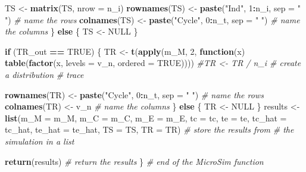 \documentclass[
]{article}
\newenvironment{Shaded}{\begin{snugshade}}{\end{snugshade}}
\newcommand{\AttributeTok}[1]{\textcolor[rgb]{0.13,0.29,0.53}{#1}}
\newcommand{\CommentTok}[1]{\textcolor[rgb]{0.56,0.35,0.01}{\textit{#1}}}
\newcommand{\ConstantTok}[1]{\textcolor[rgb]{0.56,0.35,0.01}{#1}}
\newcommand{\ControlFlowTok}[1]{\textcolor[rgb]{0.13,0.29,0.53}{\textbf{#1}}}
\newcommand{\DecValTok}[1]{\textcolor[rgb]{0.00,0.00,0.81}{#1}}
\newcommand{\FunctionTok}[1]{\textcolor[rgb]{0.13,0.29,0.53}{\textbf{#1}}}
\newcommand{\NormalTok}[1]{#1}
\newcommand{\OtherTok}[1]{\textcolor[rgb]{0.56,0.35,0.01}{#1}}
\newcommand{\SpecialCharTok}[1]{\textcolor[rgb]{0.81,0.36,0.00}{\textbf{#1}}}
\newcommand{\StringTok}[1]{\textcolor[rgb]{0.31,0.60,0.02}{#1}}
\begin{document}
\begin{Shaded}
\begin{Highlighting}[]
\NormalTok{    TS }\OtherTok{\textless{}{-}} \FunctionTok{matrix}\NormalTok{(TS, }\AttributeTok{nrow =}\NormalTok{ n\_i)}
    \FunctionTok{rownames}\NormalTok{(TS) }\OtherTok{\textless{}{-}} \FunctionTok{paste}\NormalTok{(}\StringTok{"Ind"}\NormalTok{,   }\DecValTok{1}\SpecialCharTok{:}\NormalTok{n\_i, }\AttributeTok{sep =} \StringTok{" "}\NormalTok{)   }\CommentTok{\# name the rows }
    \FunctionTok{colnames}\NormalTok{(TS) }\OtherTok{\textless{}{-}} \FunctionTok{paste}\NormalTok{(}\StringTok{"Cycle"}\NormalTok{, }\DecValTok{0}\SpecialCharTok{:}\NormalTok{n\_t, }\AttributeTok{sep =} \StringTok{" "}\NormalTok{)   }\CommentTok{\# name the columns }
\NormalTok{  \} }\ControlFlowTok{else}\NormalTok{ \{}
\NormalTok{    TS }\OtherTok{\textless{}{-}} \ConstantTok{NULL}
\NormalTok{  \}}
  
  \ControlFlowTok{if}\NormalTok{ (TR\_out }\SpecialCharTok{==} \ConstantTok{TRUE}\NormalTok{) \{}
\NormalTok{    TR }\OtherTok{\textless{}{-}} \FunctionTok{t}\NormalTok{(}\FunctionTok{apply}\NormalTok{(m\_M, }\DecValTok{2}\NormalTok{, }
                  \ControlFlowTok{function}\NormalTok{(x) }\FunctionTok{table}\NormalTok{(}\FunctionTok{factor}\NormalTok{(x, }\AttributeTok{levels =}\NormalTok{ v\_n, }\AttributeTok{ordered =} \ConstantTok{TRUE}\NormalTok{))))}
    \CommentTok{\#TR \textless{}{-} TR / n\_i                                   \# create a distribution }
    \CommentTok{\# trace}
    
    \FunctionTok{rownames}\NormalTok{(TR) }\OtherTok{\textless{}{-}} \FunctionTok{paste}\NormalTok{(}\StringTok{"Cycle"}\NormalTok{, }\DecValTok{0}\SpecialCharTok{:}\NormalTok{n\_t, }\AttributeTok{sep =} \StringTok{" "}\NormalTok{) }\CommentTok{\# name the rows }
    \FunctionTok{colnames}\NormalTok{(TR) }\OtherTok{\textless{}{-}}\NormalTok{ v\_n                              }\CommentTok{\# name the columns }
\NormalTok{  \} }\ControlFlowTok{else}\NormalTok{ \{}
\NormalTok{    TR }\OtherTok{\textless{}{-}} \ConstantTok{NULL}
\NormalTok{  \}}
\NormalTok{  results }\OtherTok{\textless{}{-}} \FunctionTok{list}\NormalTok{(}\AttributeTok{m\_M =}\NormalTok{ m\_M, }\AttributeTok{m\_C =}\NormalTok{ m\_C, }\AttributeTok{m\_E =}\NormalTok{ m\_E, }\AttributeTok{tc =}\NormalTok{ tc, }\AttributeTok{te =}\NormalTok{ te, }
                  \AttributeTok{tc\_hat =}\NormalTok{ tc\_hat, }\AttributeTok{te\_hat =}\NormalTok{ te\_hat, }
                  \AttributeTok{TS =}\NormalTok{ TS, }\AttributeTok{TR =}\NormalTok{ TR)                  }\CommentTok{\# store the results from }
                                                     \CommentTok{\# the simulation in a list}
  
  \FunctionTok{return}\NormalTok{(results)  }\CommentTok{\# return the results}
\NormalTok{\}  }\CommentTok{\# end of the MicroSim function  }
\end{Highlighting}
\end{Shaded}
\end{document}
